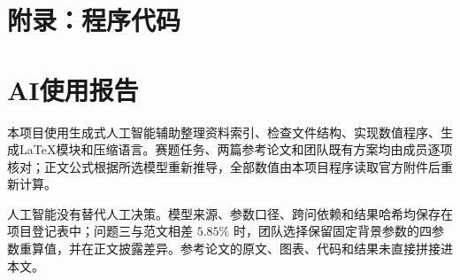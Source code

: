 \documentclass[UTF8,fontset=fandol,12pt,a4paper]{ctexart}
\begin{document}
	\newpage
	\section*{附录：程序代码}
	
	
	
	\newpage
	\section*{AI使用报告}
	
	本项目使用生成式人工智能辅助整理资料索引、检查文件结构、实现数值程序、生成LaTeX模块和压缩语言。赛题任务、两篇参考论文和团队既有方案均由成员逐项核对；正文公式根据所选模型重新推导，全部数值由本项目程序读取官方附件后重新计算。
	
	人工智能没有替代人工决策。模型来源、参数口径、跨问依赖和结果哈希均保存在项目登记表中；问题三与范文相差 $5.85\%$ 时，团队选择保留固定背景参数的四参数重算值，并在正文披露差异。参考论文的原文、图表、代码和结果未直接拼接进本文。
	
\end{document}
